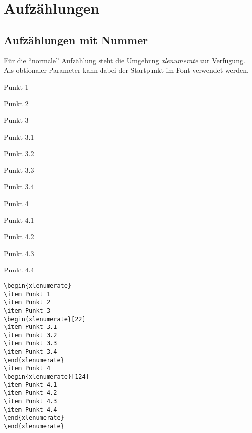 \documentclass{fontdokuold}
\begin{document}
\section{Aufzählungen}
\subsection{Aufzählungen mit Nummer}

Für die "`normale"' Aufzählung steht die Umgebung \emph{xlenumerate} zur Verfügung.
Als obtionaler Parameter kann dabei der Startpunkt im Font verwendet werden.


\begin{xlenumerate}
\item Punkt 1
\item Punkt 2
\item Punkt 3
\begin{xlenumerate}[22]
\item Punkt 3.1
\item Punkt 3.2
\item Punkt 3.3
\item Punkt 3.4
\end{xlenumerate}
\item Punkt 4
\begin{xlenumerate}[124]
\item Punkt 4.1
\item Punkt 4.2
\item Punkt 4.3
\item Punkt 4.4
\end{xlenumerate}
\end{xlenumerate}

\begin{lstlisting}
\begin{xlenumerate}
\item Punkt 1
\item Punkt 2
\item Punkt 3
\begin{xlenumerate}[22]
\item Punkt 3.1
\item Punkt 3.2
\item Punkt 3.3
\item Punkt 3.4
\end{xlenumerate}
\item Punkt 4
\begin{xlenumerate}[124]
\item Punkt 4.1
\item Punkt 4.2
\item Punkt 4.3
\item Punkt 4.4
\end{xlenumerate}
\end{xlenumerate}
\end{lstlisting}
\end{document}

